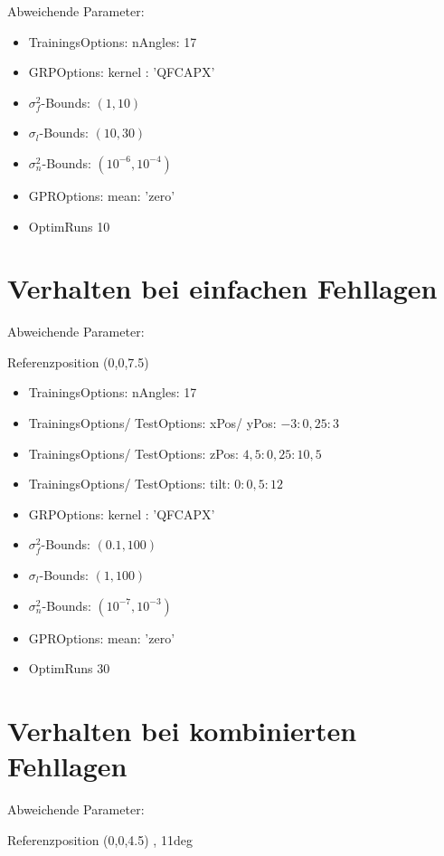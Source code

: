 Abweichende Parameter:

\begin{itemize}
	\item TrainingsOptions: nAngles: 17
	\item GRPOptions: kernel : 'QFCAPX'
	\item $\sigma_f^2$-Bounds: $(1,10)$
	\item $\sigma_l$-Bounds: $(10,30)$
	\item $\sigma_n^2$-Bounds: $(10^{-6},10^{-4})$
	\item GPROptions: mean: 'zero'
	\item OptimRuns 10
\end{itemize}


\section{Verhalten bei einfachen Fehllagen}\label{sec:paramexp5}


Abweichende Parameter:

Referenzposition (0,0,7.5)

\begin{itemize}
	\item TrainingsOptions: nAngles: 17
	\item TrainingsOptions/ TestOptions: xPos/ yPos: $-3:0,25:3$
	\item TrainingsOptions/ TestOptions: zPos: $4,5:0,25:10,5$
	\item TrainingsOptions/ TestOptions: tilt: $0:0,5:12$
	\item GRPOptions: kernel : 'QFCAPX'
	\item $\sigma_f^2$-Bounds: $(0.1,100)$
	\item $\sigma_l$-Bounds: $(1,100)$
	\item $\sigma_n^2$-Bounds: $(10^{-7},10^{-3})$
	\item GPROptions: mean: 'zero'
	\item OptimRuns 30
\end{itemize}


\section{Verhalten bei kombinierten Fehllagen}\label{sec:paramexp6}


Abweichende Parameter:

Referenzposition (0,0,4.5) , 11deg 

